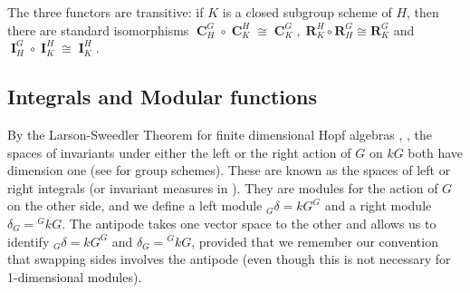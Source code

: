 \documentclass[12pt]{amsart}
\theoremstyle{definition}
\DeclareMathOperator{\ind}{\mathbf{I}}
\DeclareMathOperator{\coind}{\mathbf{C}}
\begin{document}
The three functors are transitive: if $K$ is a closed subgroup scheme of $H$, then there are standard isomorphisms $\coind_H^G\circ\coind_K^H\cong\coind_K^G,\; \mathbf{R}_K^H\circ \mathbf{R}_H^G \cong\mathbf{R}_K^G$ and $\ind_H^G\circ \ind_K^H\cong\ind_K^H$. 




\subsection{Integrals and Modular functions} \label{sec:modular}

By the Larson-Sweedler Theorem for finite dimensional Hopf algebras \cite[3.2]{MR2894798}, \cite[2.1.3]{MR1243637}, the spaces of invariants under either the left or the right action of $G$ on $kG$ both have dimension one (see \cite[I.8.7]{MR2015057} for group schemes). These are known as the spaces of left or right integrals \cite[2.1.1]{MR1243637} (or invariant measures in \cite[I.8.8]{MR2015057}). They are modules for the action of $G$ on the other side, and we define a left module ${}_G\delta = kG^G$ and a right module $\delta_G = {}^GkG$. The antipode takes one vector space to the other and allows us to identify ${}_G\delta = kG^G$ and $\delta_G = {}^GkG$, provided that we remember our convention that swapping sides involves the antipode (even though this is not necessary for 1-dimensional modules).
\end{document}
